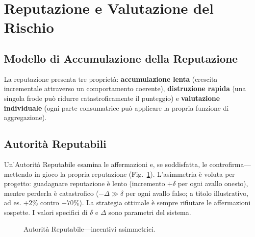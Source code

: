 \documentclass[11pt,a4paper,twocolumn]{article}
\begin{document}
\section{Reputazione e Valutazione del Rischio}

\subsection{Modello di Accumulazione della Reputazione}

La reputazione presenta tre proprietà: \textbf{accumulazione lenta} (crescita incrementale attraverso un comportamento coerente), \textbf{distruzione rapida} (una singola frode può ridurre catastroficamente il punteggio) e \textbf{valutazione individuale} (ogni parte consumatrice può applicare la propria funzione di aggregazione).

\subsection{Autorità Reputabili}

Un'Autorità Reputabile esamina le affermazioni e, se soddisfatta, le controfirma---mettendo in gioco la propria reputazione (Fig.~\ref{fig:authority}). L'asimmetria è voluta per progetto: guadagnare reputazione è lento (incremento $+\delta$ per ogni avallo onesto), mentre perderla è catastrofico ($-\Delta \gg \delta$ per ogni avallo falso; a titolo illustrativo, ad es. $+2\%$ contro $-70\%$). La strategia ottimale è sempre rifiutare le affermazioni sospette. I valori specifici di $\delta$ e $\Delta$ sono parametri del sistema.

\begin{figure}[ht]
\centering
{}
\caption{Autorità Reputabile---incentivi asimmetrici.}
\label{fig:authority}
\end{figure}
\end{document}
